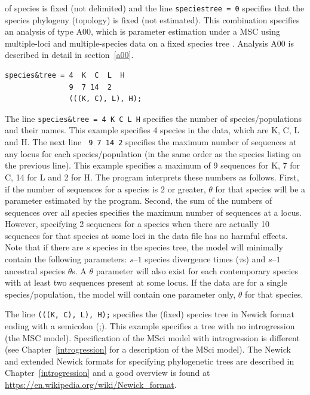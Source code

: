 \documentclass{book}
\numberwithin{equation}{section} \renewcommand{\baselinestretch}{0.55}
\begin{document}
of species is fixed (not delimited) and the line \texttt{speciestree =
  0} specifies that the species phylogeny (topology) is fixed (not
estimated). This combination specifies an analysis of type A00, which
is parameter estimation under a MSC using multiple-loci and
multiple-species data on a fixed species tree \citep{Rannala2003,
  Burgess2008}. Analysis A00 is described in detail in
section~\ref{a00}.
\begin{verbatim}
species&tree = 4  K  C  L  H
               9  7 14  2
               (((K, C), L), H);
\end{verbatim}
The line \texttt{species\&tree = 4 K C L H} specifies the number of
species/populations and their names.  This example specifies 4 species
in the data, which are K, C, L and H.  The next line \texttt{ 9 7 14
  2} specifies the maximum number of sequences at any locus for each
species/population (in the same order as the species listing on the
previous line).  This example specifies a maximum of 9 sequences for
K, 7 for C, 14 for L and 2 for H.  The program interprets these
numbers as follows.  First, if the number of sequences for a species
is 2 or greater, $\theta$ for that species will be a parameter
estimated by the program.  Second, the sum of the numbers of sequences
over all species specifies the maximum number of sequences at a locus.
However, specifying 2 sequences for a species when there are actually
10 sequences for that species at some loci in the data file has no
harmful effects.  Note that if there are $s$ species in the species
tree, the model will minimally contain the following parameters:
$s – 1$ species divergence times ($\tau$s) and $s – 1$ ancestral
species $\theta$s.  A $\theta$ parameter will also exist for each
contemporary species with at least two sequences present at some
locus. If the data are for a single species/population, the model will
contain one parameter only, $\theta$ for that species.

The line \texttt{(((K, C), L), H);} specifies the (fixed) species tree
in Newick format ending with a semicolon (;).  This example specifies
a tree with no introgression (the MSC model). Specification of the
MSci model with introgression is different (see
Chapter~\ref{introgression} for a description of the MSci model). The
Newick and extended Newick formats for specifying phylogenetic trees
are described in Chapter~\ref{introgression} and a good overview is
found at \url{https://en.wikipedia.org/wiki/Newick_format}.
\end{document}
